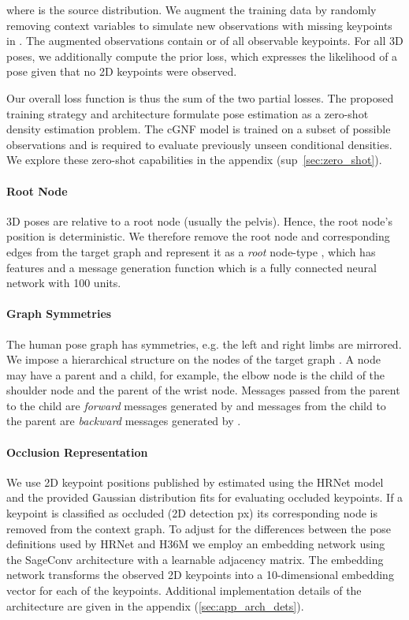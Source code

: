\documentclass{article} \usepackage{iclr2023_conference,times}
\begin{document}
    where  is the source distribution.
    We augment the training data by randomly removing context variables to simulate new observations with missing keypoints in .
    The augmented observations contain  or  of all observable keypoints.
    For all 3D poses, we additionally compute the prior loss, which expresses the likelihood of a pose given that no 2D keypoints were observed.
    
    Our overall loss function is thus the sum of the two partial losses. 
    The proposed training strategy and architecture formulate pose estimation as a zero-shot density estimation problem.
    The cGNF model is trained on a subset of possible observations and is required to evaluate previously unseen conditional densities.
    We explore these zero-shot capabilities in the appendix (sup~\ref{sec:zero_shot}).
    
    \paragraph{Root Node}
    3D poses are relative to a root node (usually the pelvis).
    Hence, the root node's position is deterministic.
    We therefore remove the root node and corresponding edges from the target graph  and represent it as a \textit{root} node-type , which has features  and a message generation function  which is a fully connected neural network with 100 units.

    \paragraph{Graph Symmetries}
    The human pose graph has symmetries, e.g. the left and right limbs are mirrored.
    We impose a hierarchical structure on the nodes of the target graph .
    A node may have a parent and a child, for example, the elbow node is the child of the shoulder node and the parent of the wrist node.
    Messages passed from the parent to the child are \textit{forward} messages generated by  and messages from the child to the parent are \textit{backward} messages generated by .

    \paragraph{Occlusion Representation}
    We use 2D keypoint positions published by \citet{Wehrbein_Rudolph_Rosenhahn_Wandt_2021} estimated using the HRNet model \citep{sun2019deep} and the provided Gaussian distribution fits for evaluating occluded keypoints.
    If a keypoint is classified as occluded (2D detection px) its corresponding node is removed from the context graph.
    To adjust for the differences between the pose definitions used by HRNet and H36M we employ an embedding network using the SageConv architecture \citep{hamilton_ying_leskovec} with a learnable adjacency matrix.
    The embedding network transforms the observed 2D keypoints into a 10-dimensional embedding vector for each of the keypoints. Additional implementation details of the architecture are given in the appendix (\ref{sec:app_arch_dets}).
\end{document}
